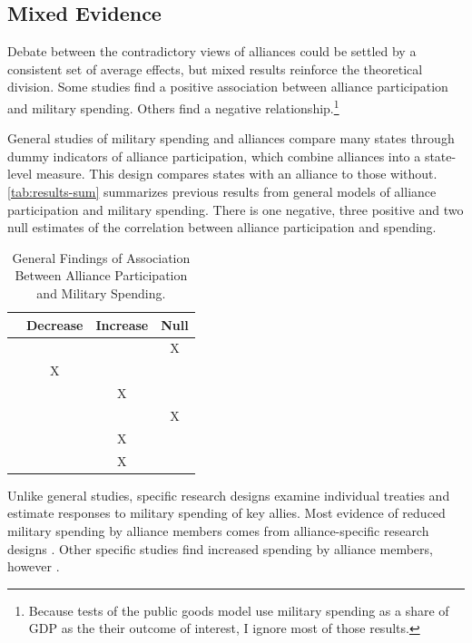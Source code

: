 \documentclass[12pt]{article}
\begin{document}
\subsection{Mixed Evidence} 


Debate between the contradictory views of alliances could be settled by a consistent set of average effects, but mixed results reinforce the theoretical division.
Some studies find a positive association between alliance participation and military spending. 
Others find a negative relationship.\footnote{
Because tests of the public goods model use military spending as a share of GDP as the their outcome of interest, I ignore most of those results.} 


General studies of military spending and alliances compare many states through dummy indicators of alliance participation, which combine alliances into a state-level measure. 
This design compares states with an alliance to those without.
\autoref{tab:results-sum} summarizes previous results from general models of alliance participation and military spending. 
There is one negative, three positive and two null estimates of the correlation between alliance participation and spending. 


\begin{table}[hbt!]
\begin{center}
\begin{tabular}{lccc}
     & Decrease & Increase & Null \\
\hline
\citet{MostSiverson1987} &  &  & X \\
\citet{Conybeare1994} & X & &  \\
\citet{Diehl1994} &  & X &  \\
\citet{Goldsmith2003} &  &  & X \\
\citet{MorganPalmer2006} &  & X & \\ 
\citet{QuirozFlores2011} &  & X &  \\ 
\hline
\end{tabular}
\caption{General Findings of Association Between Alliance Participation and Military Spending.}
\label{tab:results-sum}
\end{center} 
\end{table}


Unlike general studies, specific research designs examine individual treaties and estimate responses to military spending of key allies. 
Most evidence of reduced military spending by alliance members comes from alliance-specific research designs \citep{BarnettLevy1991, Morrow1993, Sorokin1994, PluemperNeumayer2015, GeorgeSandler2017}.
Other specific studies find increased spending by alliance members, however \citep{ConybeareSandler1990, Chenetal1996}. 
\end{document}
